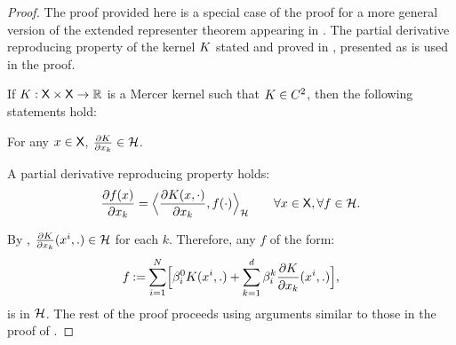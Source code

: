 \begin{proof}
 The proof provided here is a special case of the proof for a more general version of the extended representer theorem appearing in \cite{zho08}. The partial derivative reproducing property of the kernel $K$ stated and proved in \cite[Theorem 1]{zho08}, presented as  is used in the proof.  
 \begin{lemma}
 If $K :{\sf X} \times {\sf X} \to \mathbb{R}$ is a Mercer kernel such that $K \in C^2$, then the following statements hold:
 \begin{romannum}
 \item For any $x \in {\sf X}$, $\frac{\partial K}{\partial x_k} \in {\cal H}$. 
 \item A partial derivative reproducing property holds:
 \begin{equation}
 \frac{\partial f(x)}{\partial x_k} = \Bigl \langle \frac{\partial K(x, \cdot)}{\partial x_k} , f(\cdot) \Bigr \rangle_{\cal H} \qquad \forall x \in {\sf X}, \forall f \in {\cal H}.
 \end{equation}
 \end{romannum}
 \label{lemma:der_rep_property}
 \end{lemma}
 By , $\frac{\partial K}{\partial x_k}(x^i,.) \in {\cal H}$ for each $k$.
Therefore, any $f$ of the form:
	\[
	f \mathbin{:=}  \sum_{i=1}^N  \Bigl[
	\beta_i^{0}  K(x^i, .)   +  \sum_{k =1}^d  \beta_i^{k} \frac{\partial K}{\partial x_k}  (x^i, .) \Bigr],
	\]
	is in ${\cal H}$. The rest of the proof proceeds using arguments similar to those in the proof of . 


\end{proof}
